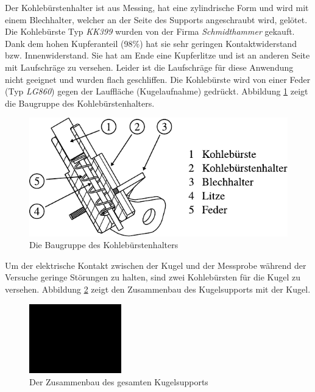 Der Kohlebürstenhalter ist aus Messing, hat eine zylindrische Form und wird mit einem Blechhalter, welcher an der Seite des Supports angeschraubt wird, gelötet.
Die Kohlebürste Typ \textit{KK399} wurden von der Firma \textit{Schmidthammer} gekauft.
Dank dem hohen Kupferanteil (98\%) hat sie sehr geringen Kontaktwiderstand bzw. Innenwiderstand.
Sie hat am Ende eine Kupferlitze und ist an anderen Seite mit Laufschräge zu versehen.
Leider ist die Laufschräge für diese Anwendung nicht geeignet und wurden flach geschliffen.
Die Kohlebürste wird von einer Feder (Typ \textit{LG860}) gegen der Lauffläche (Kugelaufnahme) gedrückt.
Abbildung \ref{fig:die_baugruppe_des_kohlebuerstenhalters} zeigt die Baugruppe des Kohlebürstenhalters.
\begin{figure}[htb]
    \centering
    \includegraphics[]{./images/kohlebuerstenhalter_asm.pdf}
    \caption{Die Baugruppe des Kohlebürstenhalters}
    \label{fig:die_baugruppe_des_kohlebuerstenhalters}
\end{figure}
%

Um der elektrische Kontakt zwischen der Kugel und der Messprobe während der Versuche geringe Störungen zu halten, sind zwei Kohlebürsten für die Kugel zu versehen.
Abbildung \ref{fig:der_zusammenbau_des_gesamten_kugelsupports} zeigt den Zusammenbau des Kugelsupports mit der Kugel.
\begin{figure}[htb]
    \centering
    \includegraphics[width=4cm]{./images/blank_img.jpg}
    \caption{Der Zusammenbau des gesamten Kugelsupports}
    \label{fig:der_zusammenbau_des_gesamten_kugelsupports}
\end{figure}
%

